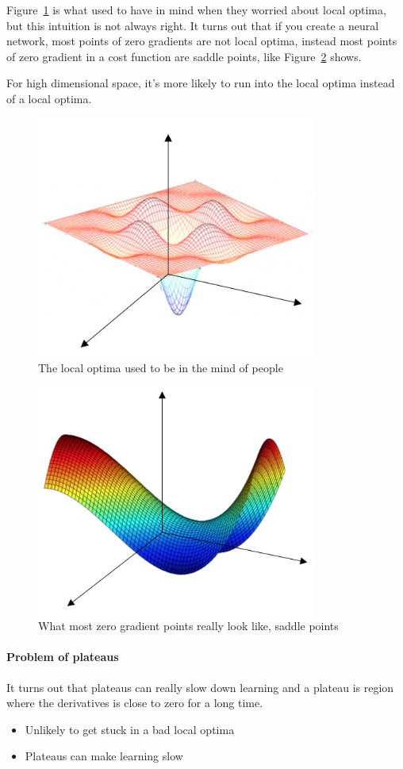 \documentclass[UTF8]{article}
\begin{document}
Figure~\ref{fig:local-optima-1} is what used to have in mind when they worried about local optima,
but this intuition is not always right. It turns out that if you create a neural network, most
points of zero gradients are not local optima, instead most points of zero gradient in a cost
function are saddle points, like Figure~\ref{fig:local-optima-2} shows.

For high dimensional space, it's more likely to run into the local optima instead of a local optima.

\begin{figure}[htb]
    \centering
    \includegraphics[width=25em]{figures/local-optima-1}
    \caption{The local optima used to be in the mind of people}
    \label{fig:local-optima-1}
\end{figure}

\begin{figure}[htb]
    \centering
    \includegraphics[width=25em]{figures/local-optima-2}
    \caption{What most zero gradient points really look like, saddle points}
    \label{fig:local-optima-2}
\end{figure}

\paragraph{Problem of plateaus}
It turns out that plateaus can really slow down learning and a plateau is region where the
derivatives is close to zero for a long time.

\begin{itemize}
    \item Unlikely to get stuck in a bad local optima
    \item Plateaus can make learning slow
\end{itemize}
\end{document}
